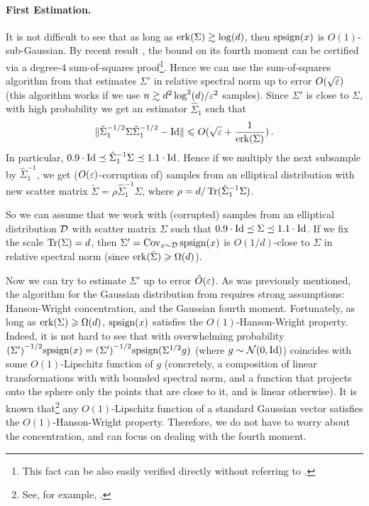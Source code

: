 \paragraph{First Estimation.} It is not difficult to see that as long as $\mathrm{erk}(\Sigma)\gtrsim \log(d)$, then $\textrm{spsign}(x)$ is $O(1)$-sub-Gaussian. By recent result \cite{sos-subgaussian}, the bound on its fourth moment can be certified via a degree-$4$ sum-of-squares proof\footnote{This fact can be also easily verified directly without referring to \cite{sos-subgaussian}.}. Hence we can use the sum-of-squares algorithm from \cite{KS17} that estimates $\Sigma'$ in relative spectral norm up to error $O(\sqrt{\varepsilon})$ (this algorithm works if we use $n\gtrsim d^2\log^2(d)/\varepsilon^2$ samples). Since $\Sigma'$ is close to $\Sigma$, with high probability we get an estimator $\hat{\Sigma}_1$ such that 
\[
\lVert\hat{\Sigma}_1^{-1/2} \Sigma \hat{\Sigma}_1^{-1/2} - \mathrm{Id}\rVert  \leqslant O(\sqrt{{\varepsilon}} + \frac{1}{\mathrm{erk}(\Sigma)})\,.
\]
In particular, $0.9 \cdot \mathrm{Id} \preceq \hat{\Sigma}_1^{-1}\Sigma \preceq 1.1\cdot \mathrm{Id}$. 
Hence if we multiply the next subsample by $\hat{\Sigma}_1^{-1}$, we get ($O(\varepsilon)$-corruption of) samples from an elliptical distribution with new scatter matrix $\tilde{\Sigma} = \rho \hat{\Sigma}_1^{-1} \Sigma$, where $\rho = d/\operatorname{Tr}(\hat{\Sigma}_1^{-1}\Sigma)$. 

So we can assume that we work with (corrupted) samples from an elliptical  distribution $\mathcal D$ with scatter matrix $\Sigma$ such that $0.9 \cdot \mathrm{Id} \preceq \Sigma \preceq 1.1\cdot \mathrm{Id}$. If we fix the scale $\operatorname{Tr}(\Sigma) = d$, then
$\Sigma' = \operatorname*{\mathrm{Cov}}_{x\sim \mathcal D}\textrm{spsign}(x)$ is $O(1/d)$-close to $\Sigma$ in relative spectral norm (since $\mathrm{erk}(\tilde{\Sigma}) \geqslant \Omega(d)$).

Now we can try to estimate $\Sigma'$ up to error $\tilde{O}(\varepsilon)$. As was previously mentioned, the algorithm for the Gaussian distribution from \cite{DiakonikolasKK016} requires strong assumptions: Hanson-Wright concentration, and the Gaussian fourth moment. 
Fortunately, as long as $\mathrm{erk}(\Sigma)\geqslant \Omega(d)$, $\textrm{spsign}(x)$ satisfies the $O(1)$-Hanson-Wright property. Indeed, it is not hard to see that with overwhelming probability $\Paren{\Sigma'}^{-1/2}\spsign(x) = \Paren{\Sigma'}^{-1/2}\spsign(\Sigma^{1/2} g)$ (where $g\sim \mathcal N(0,\mathrm{Id})$) coincides with some $O(1)$-Lipschitz function of $g$ (concretely, a composition of linear transformations with with bounded spectral norm, and a function that projects onto the sphere only the points that are close to it, and is linear otherwise). It is known that\footnote{See, for example, \cite{log-sobolev-are-hanson-wright}.}  any $O(1)$-Lipschitz function of a standard Gaussian vector satisfies the $O(1)$-Hanson-Wright property. Therefore, we do not have to worry about the concentration, and can focus on dealing with the fourth moment.

